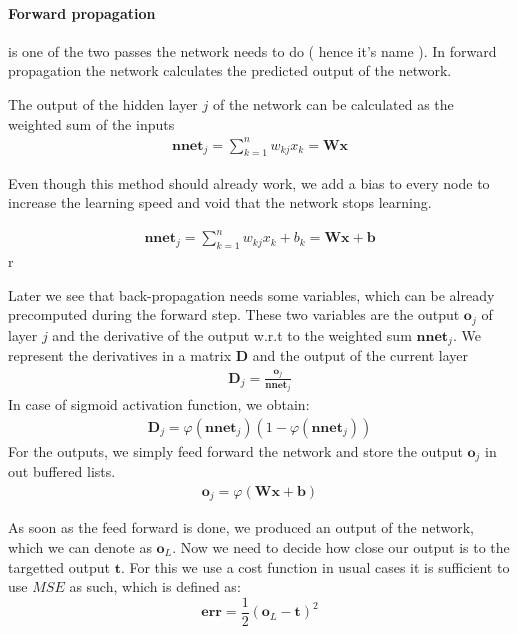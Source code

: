 \paragraph{Forward propagation} is one of the two passes the network needs to do ( hence it's name ).
In forward propagation the network calculates the predicted output of the network.

The output of the hidden layer $j$ of the network can be calculated as the weighted sum of the inputs
\begin{align}
\mathbf{nnet}_j = \sum_{k=1}^{n}w_{kj}x_k = \mathbf{W} \mathbf{x}
\end{align}

Even though this method should already work, we add a bias to every node to increase the learning speed and void that the network stops learning.

\begin{align}
\mathbf{nnet}_j = \sum_{k=1}^{n}w_{kj}x_k + b_k = \mathbf{W} \mathbf{x} + \mathbf{b}
\end{align}r


Later we see that back-propagation needs some variables, which can be already precomputed during the forward step. These two variables are the output $\mathbf{o}_j$ of layer $j$ and the derivative of the output w.r.t to the weighted sum $\mathbf{nnet}_j$. We represent the derivatives in a matrix $\mathbf{D}$ and the output of the current layer 
\begin{align}
\mathbf{D}_j = \frac{\mathbf{o}_j}{\mathbf{nnet}_j}
\end{align}
In case of sigmoid activation function, we obtain:
\begin{align}
\mathbf{D}_j = \varphi \left( \mathbf{nnet}_j \right) \left( 1 - \varphi \left(\mathbf{nnet}_j \right) \right)
\end{align}
For the outputs, we simply feed forward the network and store the output $\mathbf{o}_j$ in out buffered lists.
\begin{align}
\mathbf{o}_j = \varphi \left( \mathbf{Wx+b} \right)
\end{align}

As soon as the feed forward is done, we produced an output of the network, which we can denote as $\mathbf{o}_L$. Now we need to decide how close our output is to the targetted output $\mathbf{t}$. For this we use a cost function in usual cases it is sufficient to use $MSE$ as such, which is defined as:
\begin{equation}
\label{eq:mse}
\mathbf{err} = \frac{1}{2} \left( \mathbf{o}_L - \mathbf{t} \right) ^2
\end{equation}

